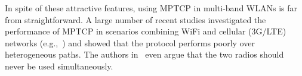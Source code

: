 In spite of these attractive features, using MPTCP in multi-band WLANs
is far from straightforward. A large number of recent studies
investigated the performance of MPTCP in scenarios combining WiFi and
cellular (3G/LTE) networks
(e.g.,~\cite{raiciu:nsdi2012,saha:mobiwac2017}) and showed that the
protocol performs poorly over heterogeneous paths.
The authors in~\cite{sur:mobicom2017,nguyen:vtc2017} even argue that the two
radios should never be used simultaneously.

